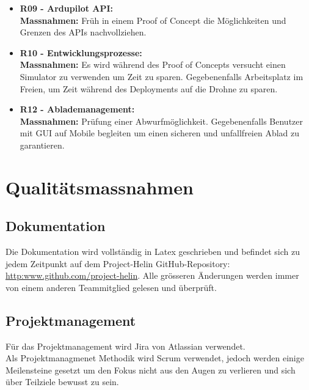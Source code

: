 \begin{itemize}
	\item{\textbf{R09 - Ardupilot API:} \\
	\textbf{Massnahmen:} Früh in einem Proof of Concept die Möglichkeiten und Grenzen des APIs nachvollziehen.}
	
	\item{\textbf{R10 - Entwicklungsprozesse:} \\
	\textbf{Massnahmen:} Es wird während des Proof of Concepts versucht einen Simulator zu verwenden um Zeit zu sparen. Gegebenenfalls Arbeitsplatz im Freien, um Zeit während des Deployments auf die Drohne zu sparen.}
	
	\item{\textbf{R12 - Ablademanagement:} \\
	\textbf{Massnahmen:} Prüfung einer Abwurfmöglichkeit. Gegebenenfalls Benutzer mit GUI auf Mobile begleiten um einen sicheren und unfallfreien Ablad zu garantieren.}
\end{itemize}

\section{Qualitätsmassnahmen}	
\subsection{Dokumentation}
Die Dokumentation wird vollständig in Latex geschrieben und befindet sich zu jedem Zeitpunkt auf dem Project-Helin GitHub-Repository: \url{http:www.github.com/project-helin}. Alle grösseren Änderungen werden immer von einem anderen Teammitglied gelesen und überprüft.

\subsection{Projektmanagement}
Für das Projektmanagement wird Jira von Atlassian verwendet. \\
Als Projektmanagmenet Methodik wird Scrum verwendet, jedoch werden einige Meilensteine gesetzt um den Fokus nicht aus den Augen zu verlieren und sich über Teilziele bewusst zu sein.

